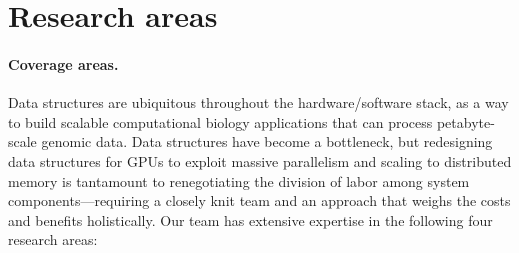 \section{Research areas}





\paragraph{Coverage areas.} 
Data structures are ubiquitous throughout the hardware/software stack, as a way to build scalable computational biology applications that can process petabyte-scale genomic data.
Data structures have become a bottleneck, but redesigning data structures for GPUs to exploit massive parallelism and scaling to distributed memory is tantamount to renegotiating the division of labor among system components---requiring a closely knit team and an approach that weighs the costs and benefits holistically.
Our team has extensive expertise in the following four research areas:

